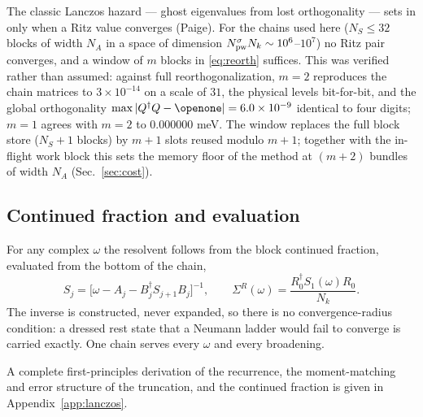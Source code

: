 \documentclass[aps,prx,reprint,superscriptaddress,nofootinbib,longbibliography]{revtex4-2}
\begin{document}
The classic Lanczos hazard --- ghost eigenvalues from lost orthogonality ---
sets in only when a Ritz value converges (Paige). For the chains used here
($N_S\le32$ blocks of width $N_A$ in a space of dimension
$N^{\sigma}_{\rm pw}N_k\sim10^{6}$--$10^{7}$) no Ritz pair converges, and a
window of $m$ blocks in \eqref{eq:reorth} suffices. This was verified rather
than assumed: against full reorthogonalization, $m=2$ reproduces the chain
matrices to $3\times10^{-14}$ on a scale of $31$, the physical levels
bit-for-bit, and the global orthogonality
$\max|Q^{\dagger}Q-\openone|=6.0\times10^{-9}$ identical to four digits;
$m=1$ agrees with $m=2$ to $0.000000$ meV. The window replaces the full
block store ($N_S{+}1$ blocks) by $m{+}1$ slots reused modulo $m{+}1$;
together with the in-flight work block this sets the memory floor of the
method at $(m{+}2)$ bundles of width $N_A$ (Sec.~\ref{sec:cost}).

\subsection{Continued fraction and evaluation}

For any complex $\omega$ the resolvent follows from the block continued
fraction, evaluated from the bottom of the chain,
\begin{equation}
  S_j = \big[\omega - A_j - B_j^{\dagger} S_{j+1} B_j \big]^{-1},
  \qquad
  \Sigma^R(\omega) = \frac{R_0^{\dagger} S_1(\omega) R_0}{N_k}.
  \label{eq:cf}
\end{equation}
The inverse is constructed, never expanded, so there is no convergence-radius
condition: a dressed rest state that a Neumann ladder would fail to converge is
carried exactly. One chain serves every $\omega$ and every broadening.

A complete first-principles derivation of the recurrence, the moment-matching and error structure of the truncation, and the continued fraction is given in Appendix~\ref{app:lanczos}.
\end{document}
